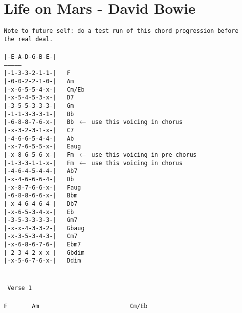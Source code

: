 \newpage
\section{Life on Mars - David Bowie}
\label{Life on Mars - David Bowie}
\texttt{Note to future self: do a test run of this chord progression before
the real deal.\\
\\
|-E-A-D-G-B-E-|\\
---------------\\
|-1-3-3-2-1-1-|\ \ \ F\\
|-0-0-2-2-1-0-|\ \ \ Am\ \ \ \\
|-x-6-5-5-4-x-|\ \ \ Cm/Eb\ \ \\
|-x-5-4-5-3-x-|\ \ \ D7\ \ \ \ \\
|-3-5-5-3-3-3-|\ \ \ Gm\ \ \ \ \\
|-1-1-3-3-3-1-|\ \ \ Bb\ \ \ \ \\
|-6-8-8-7-6-x-|\ \ \ Bb\ $\leftarrow$ use this voicing in chorus \ \\
|-x-3-2-3-1-x-|\ \ \ C7\ \ \ \ \\
|-4-6-6-5-4-4-|\ \ \ Ab\ \ \ \ \\
|-x-7-6-5-5-x-|\ \ \ Eaug\ \ \ \\
|-x-8-6-5-6-x-|\ \ \ Fm\ $\leftarrow$ use this voicing in pre-chorus\\
|-1-3-3-1-1-x-|\ \ \ Fm\ $\leftarrow$ use this voicing in chorus\\
|-4-6-4-5-4-4-|\ \ \ Ab7\ \ \ \\
|-x-4-6-6-6-4-|\ \ \ Db\ \ \ \ \\
|-x-8-7-6-6-x-|\ \ \ Faug\ \ \ \\
|-6-8-8-6-6-x-|\ \ \ Bbm\ \ \ \\
|-x-4-6-4-6-4-|\ \ \ Db7\ \ \ \\
|-x-6-5-3-4-x-|\ \ \ Eb\ \ \ \ \\
|-3-5-3-3-3-3-|\ \ \ Gm7\ \ \ \ \\
|-x-x-4-3-3-2-|\ \ \ Gbaug\ \ \\
|-x-3-5-3-4-3-|\ \ \ Cm7\ \ \ \\
|-x-6-8-6-7-6-|\ \ \ Ebm7\ \ \ \\
|-2-3-4-2-x-x-|\ \ \ Gbdim\ \ \ \\
|-x-5-6-7-6-x-|\ \ \ Ddim\ \ \ \\
\\
\\
\lbrack\ Verse\ 1\rbrack\\
\\
F\ \ \ \ \ \ \ Am\ \ \ \ \ \ \ \ \ \ \ \ \ \ \ \ \ \ \ \ \ \ \ \ \ \ Cm/Eb\\
}

